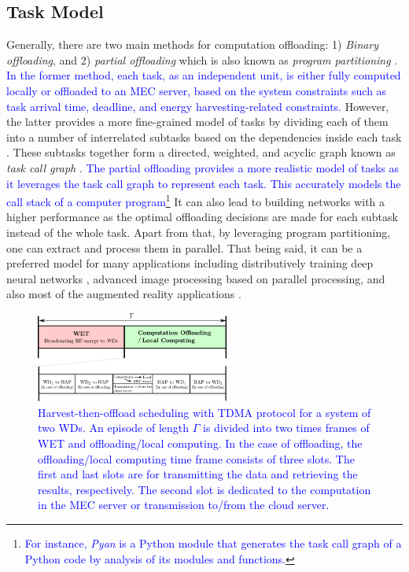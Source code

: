 \documentclass[12pt,draftclsnofoot,onecolumn]{IEEEtran}
\begin{document}
\subsection{Task Model}
Generally, there are two main methods for computation offloading: 1) \textit{Binary offloading}, and 2) \textit{partial offloading} which is also known as \textit{program partitioning} \cite{b4}. \textcolor{blue}{In the former method, each task, as an independent unit, is either fully computed locally or offloaded to an MEC server, based on the system constraints such as task arrival time, deadline, and energy harvesting-related constraints.} However, the latter provides a more fine-grained model of tasks by dividing each of them into a number of interrelated subtasks based on the dependencies inside each task \cite{b4}. These subtasks together form a directed, weighted, and acyclic graph known as \textit{task call graph} \cite{b4}. \textcolor{blue}{The partial offloading provides a more realistic model of tasks as it leverages the task call graph to represent each task. This accurately models the call stack of a computer program\footnote{\textcolor{blue}{For instance, \textit{Pyan}\cite{b41} is a Python module that generates the task call graph of a Python code by analysis of its modules and functions.}}} It can also lead to building networks with a higher performance as the optimal offloading decisions are made for each subtask instead of the whole task. Apart from that, by leveraging program partitioning, one can extract and process them in parallel. That being said, it can be a preferred model for many applications including distributively training deep neural networks \cite{b1}, advanced image processing based on parallel processing, and also most of the augmented reality applications \cite{b12}.

\begin{figure}
	\centering
	\includegraphics[width=180pt]{TDMA.pdf}
	\caption{\textcolor{blue}{Harvest-then-offload scheduling with TDMA protocol for a system of two WDs. An episode of length $\Gamma$ is divided into two times frames of WET and offloading/local computing. In the case of offloading, the offloading/local computing time frame consists of three slots. The first and last slots are for transmitting the data and retrieving the results, respectively. The second slot is dedicated to the computation in the MEC server or transmission to/from the cloud server.}}\label{fig2}
\end{figure}
\end{document}
